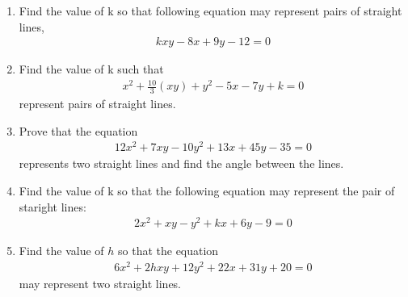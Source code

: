 \begin{enumerate}[label=\thesubsection.\arabic*.,ref=\thesubsection.\theenumi]
\item Find the value of k so that following equation may represent pairs of straight lines,
\begin{align}
kxy-8x+9y-12 = 0
\label{eq:solutions/13/10/Q_eq}
\end{align}
\solution


\item Find the value of k such that 
\begin{align}
x^{2}+ \frac{10}{3}(xy)+y^2 -5x -7y + k =0 \label{eq:solutions/13/11eq5}
\end{align}
 represent pairs of straight lines.
\\
\solution

\item Prove that the equation
\begin{align}
	12x^2 + 7xy -10y^2 +13x +45y -35 =0 
\end{align}
represents two straight lines and find the angle between the lines.
\\
\solution


\item Find the value of k so that the following equation may represent the pair of staright lines:
\begin{align}
	2x^2+ xy -y^2 + kx + 6y - 9 = 0 \label{eq:solutions/13/13/1} 
\end{align}

\solution

\item Find the value of $h$ so that the equation 
\begin{align}
6x^2+2hxy+12y^2+22x+31y+20=0
\label{eq:solutions/13/ex2/question}
\end{align}
 may represent two straight lines.
\\
\solution


\end{enumerate}


